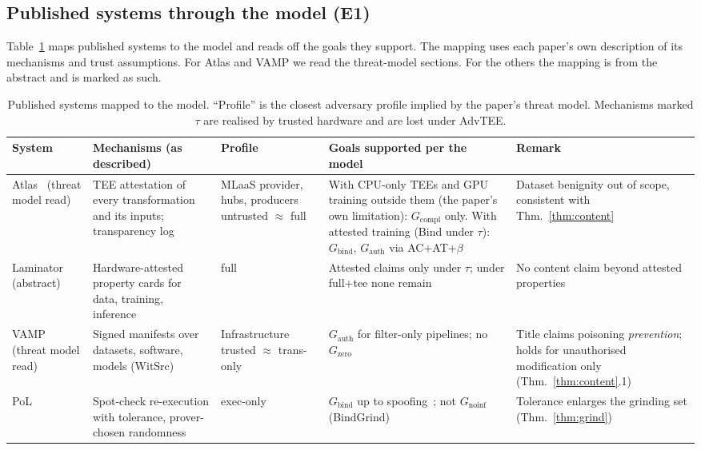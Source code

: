 \subsection{Published systems through the model (E1)}

Table~\ref{tab:e1} maps published systems to the model and reads off the goals they support.
The mapping uses each paper's own description of its mechanisms and trust assumptions. For
Atlas and VAMP we read the threat-model sections. For the others the mapping is from the
abstract and is marked as such.

\begin{table}[t]
\centering\scriptsize
\caption{Published systems mapped to the model. ``Profile'' is the closest adversary profile
implied by the paper's threat model. Mechanisms marked $\tau$ are realised by trusted
hardware and are lost under \textsf{AdvTEE}.}\label{tab:e1}
\begin{tabular}{@{}p{2.3cm}p{3.6cm}p{2.1cm}p{4.6cm}p{3.6cm}@{}}
\toprule
System & Mechanisms (as described) & Profile & Goals supported per the model & Remark\\
\midrule
Atlas~\cite{spoczynski2025atlas} (threat model read) & TEE attestation of every transformation and its inputs; transparency log & MLaaS provider, hubs, producers untrusted $\approx$ full & With CPU-only TEEs and GPU training outside them (the paper's own limitation): $G_{\mathrm{compl}}$ only. With attested training (Bind under $\tau$): $G_{\mathrm{bind}}$, $G_{\mathrm{auth}}$ via AC+AT+$\beta$ & Dataset benignity out of scope, consistent with Thm.~\ref{thm:content}\\
Laminator~\cite{duddu2025laminator} (abstract) & Hardware-attested property cards for data, training, inference & full & Attested claims only under $\tau$; under full+tee none remain & No content claim beyond attested properties\\
VAMP~\cite{stokes2021prevent} (threat model read) & Signed manifests over datasets, software, models (WitSrc) & Infrastructure trusted $\approx$ trans-only & $G_{\mathrm{auth}}$ for filter-only pipelines; no $G_{\mathrm{zero}}$ & Title claims poisoning \emph{prevention}; holds for unauthorised modification only (Thm.~\ref{thm:content}.1)\\
PoL~\cite{jia2021pol} & Spot-check re-execution with tolerance, prover-chosen randomness & exec-only & $G_{\mathrm{bind}}$ up to spoofing~\cite{fang2023pol}; not $G_{\mathrm{noinf}}$ (BindGrind) & Tolerance enlarges the grinding set (Thm.~\ref{thm:grind})\\

\end{tabular}
\end{table}
